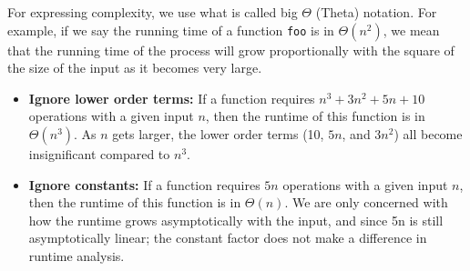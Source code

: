 For expressing complexity, we use what is called big $\Theta$ (Theta) notation.
For example, if we say the running time of a function {\tt foo} is in
$\Theta(n^2)$, we mean that the running time of the process will grow
proportionally with the square of the size of the input as it becomes very
large.

\begin{blocksection}
\begin{itemize}
\item \textbf{Ignore lower order terms:} If a function requires $n^3 + 3n^2 +
5n + 10$ operations with a given input $n$, then the runtime of this function
is in $\Theta(n^3)$.  As $n$ gets larger, the lower order terms (10, $5n$, and
$3n^2$) all become insignificant compared to $n^3$.
\item \textbf{Ignore constants:} If a function requires $5n$ operations with a
given input $n$, then the runtime of this function is in $\Theta(n)$.  We are
only concerned with how the runtime grows asymptotically with the input, and
since 5n is still asymptotically linear; the constant factor does not make a
difference in runtime analysis.
\end{itemize}
\end{blocksection}
